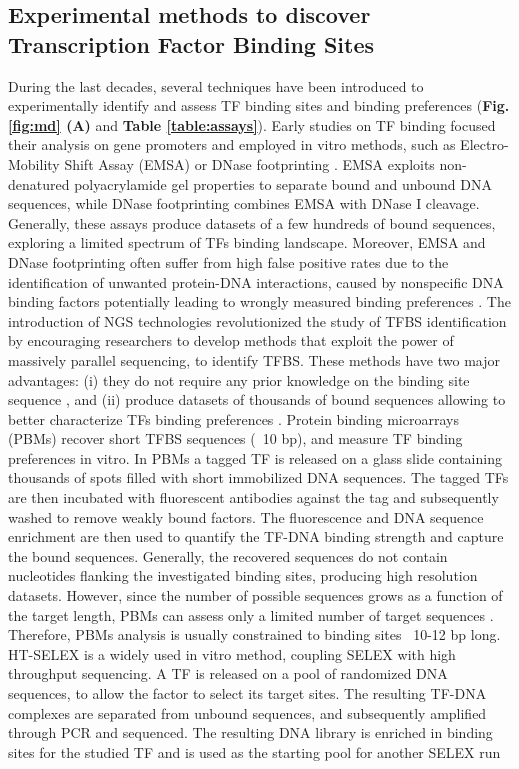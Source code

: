 \documentclass[a4paper, titlepage, 8pt, openright]{book}
\begin{document}
\subsection{Experimental methods to discover Transcription Factor Binding Sites}
During the last decades, several techniques have been introduced to experimentally identify and assess TF binding sites and binding preferences \citep{jolma2011methods} (\textbf{Fig.\ref{fig:md} (A)} and \textbf{Table \ref{table:assays}}). Early studies on TF binding focused their analysis on gene promoters \citep{stormo2000dna} and employed in vitro methods, such as Electro-Mobility Shift Assay (EMSA) \citep{garner1981gel} or DNase footprinting \citep{galas1978dnaase}. EMSA exploits non-denatured polyacrylamide gel properties to separate bound and unbound DNA sequences, while DNase footprinting combines EMSA with DNase I cleavage. Generally, these assays produce datasets of a few hundreds of bound sequences, exploring a limited spectrum of TFs binding landscape. Moreover, EMSA and DNase footprinting often suffer from high false positive rates due to the identification of unwanted protein-DNA interactions, caused by nonspecific DNA binding factors potentially leading to wrongly measured binding preferences \citep{jolma2011methods}. The introduction of NGS technologies revolutionized the study of TFBS identification by encouraging researchers to develop methods that exploit the power of massively parallel sequencing, to identify TFBS. These methods have two major advantages: (i) they do not require any prior knowledge on the binding site sequence \citep{jolma2011methods,zia2012towards}, and (ii) produce datasets of thousands of bound sequences allowing to better characterize TFs binding preferences \citep{stormo2010determining}. Protein binding microarrays (PBMs) \citep{berger2006compact,berger2009universal} recover short TFBS sequences (~10 bp), and measure TF binding preferences in vitro. In PBMs a tagged TF is released on a glass slide containing thousands of spots filled with short immobilized DNA sequences. The tagged TFs are then incubated with fluorescent antibodies against the tag and subsequently washed to remove weakly bound factors. The fluorescence and DNA sequence enrichment are then used to quantify the TF-DNA binding strength and capture the bound sequences. Generally, the recovered sequences do not contain nucleotides flanking the investigated binding sites, producing high resolution datasets. However, since the number of possible sequences grows as a function of the target length, PBMs can assess only a limited number of target sequences \citep{jolma2011methods,zia2012towards}. Therefore, PBMs analysis is usually constrained to binding sites ~10-12 bp long.  HT-SELEX \citep{jolma2011methods,jolma2010multiplexed} is a widely used in vitro method, coupling SELEX with high throughput sequencing. A TF is released on a pool of randomized DNA sequences, to allow the factor to select its target sites. The resulting TF-DNA complexes are separated from unbound sequences, and subsequently amplified through PCR and sequenced. The resulting DNA library is enriched in binding sites for the studied TF and is used as the starting pool for another SELEX run 
\end{document}
